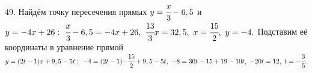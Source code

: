 49. Найдём точку пересечения прямых $y=\cfrac{x}{3}-6,5$ и $y=-4x+26:\ \cfrac{x}{3}-6,5=-4x+26,\ \cfrac{13}{3}x=32,5,\ x=\cfrac{15}{2},\ y=-4.$ Подставим её координаты в уравнение прямой $y=(2t-1)x+9,5-5t:\ -4=(2t-1)\cdot\cfrac{15}{2}+9,5-5t,\ -8=30t-15+19-10t,\ -20t=12,\ t=-\cfrac{3}{5}.$\\
